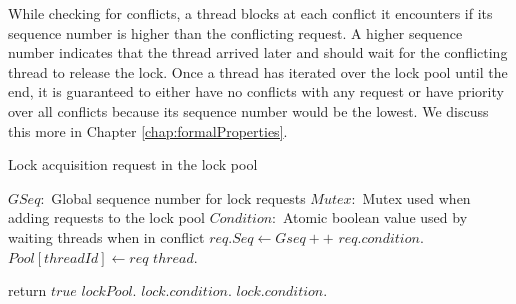 While checking for conflicts, a thread blocks at each conflict it encounters if its sequence number is higher than the conflicting request. A higher sequence number indicates that the thread arrived later and should wait for the conflicting thread to release the lock. 
Once a thread has iterated over the lock pool until the end, it is guaranteed to either have no conflicts with any request or have priority over all conflicts because its sequence number would be the lowest. We discuss this more in Chapter \ref{chap:formalProperties}.




		

\begin{algorithm}
	\caption{Lock acquisition request in the lock pool}\label{lockFunction}
	\begin{algorithmic}[1]
		\State $GSeq: $ Global sequence number for lock requests
		\State $Mutex: $ Mutex used when adding requests to the lock pool
		\State $Condition:$ Atomic boolean value used by waiting threads when in conflict
		\Statex
		\State {}
		\State $req.Seq \gets Gseq++$ \label{seqNoAllocation}
		\State $req.condition.$ \label{waitTrue}
		\State $Pool[threadId] \gets req$ \label{addToPool}
		\State {}
		 \label{conflictCheck}
		\State $thread.$
		\EndIf
		
		\EndFor
		\State return $true$
		\EndProcedure
		\Statex
		\State $lockPool.$
		\State $lock.condition.$
		\State $lock.condition.$
		\EndProcedure
	\end{algorithmic}
\end{algorithm}






